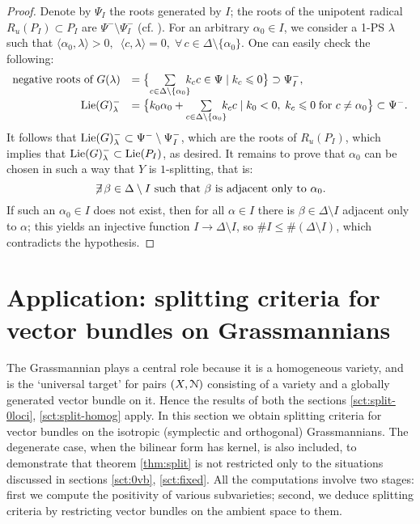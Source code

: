 \documentclass[11pt,reqno]{amsart}
\let\euf\EuScript
\let\lan\langle
\let\ran\rangle
\numberwithin{equation}{section}
\numberwithin{figure}{section}
\let\l\lambda
\let\sm\setminus
\let\les\leqslant
\begin{document}
\begin{proof}
Denote by $\Psi_I$ the roots generated by $I$; the roots of 
the unipotent radical $R_u(P_I)\subset P_I$ are $\Psi^-\sm\Psi^-_I$ 
(cf. \cite[Theorem 8.4.3]{sp}). 
For an arbitrary $\alpha_0\in I$, we consider a 1-PS $\l$ such that 
${{\lan {\alpha_0,\l}\ran}}>0,$ $\,{{\lan {c,\l}\ran}}=0,\;\forall\,c\in\Delta\sm\{\alpha_0\}.$ 
One can easily check the following:
$$
\begin{array}{rl}
\mbox{\rm negative roots of }G(\l)&=\big\{
\underset{c\in\Delta\sm\{\alpha_0\}}{\sum}\kern-1ex
k_cc\in\Psi\mid k_c\les 0\big\} \supset\Psi_I^-, 
\\[2.5ex] 
{\mathop{\rm Lie}\nolimits}(G)_\l^-&=\big\{
k_0\alpha_0+\underset{c\in\Delta\sm\{\alpha_0\}}{\sum}\kern-1exk_cc
\mid k_0<0,\;k_c\les0\;\mbox{\rm for }c\neq\alpha_0
\big\}\subset\Psi^-.
\end{array}
$$
It follows that ${\mathop{\rm Lie}\nolimits}(G)_\l^-\subset\Psi^-\sm\Psi^-_I$, which are the roots of 
$R_u(P_I)$, which implies that ${\mathop{\rm Lie}\nolimits}(G)_\l^-\subset{\mathop{\rm Lie}\nolimits}(P_I)$, as desired. 
It remains to prove that $\alpha_0$ can be chosen in such a way that 
$Y$ is $1$-splitting, that is:
$$
\not\kern-2pt\exists\,\beta\in \Delta\sm I\text{ such that }
\beta\text{ is adjacent only to }\alpha_0.
$$
If such an $\alpha_0\in I$ does not exist, then for all $\alpha\in I$ there is 
$\beta\in\Delta\sm I$ adjacent only to $\alpha$; this yields an injective function 
$I\to\Delta\sm I$, so $\#I\les\#(\Delta\sm I)$, which contradicts the hypothesis.
\end{proof}

\section{Application: splitting criteria for vector bundles on Grassmannians} \label{sct:grass}

The Grassmannian plays a central role because it is a homogeneous variety, and is the 
`universal target' for pairs $(X,{{\euf N}})$ consisting of a variety and a globally generated 
vector bundle on it. 
Hence the results of both the sections \ref{sct:split-0loci}, \ref{sct:split-homog} apply. 
In this section we obtain splitting criteria for vector bundles on the isotropic 
(symplectic and orthogonal) Grassmannians. 
The degenerate case, when the bilinear form has kernel, is also included, to demonstrate 
that theorem \ref{thm:split} is not restricted only to the situations discussed in sections 
\ref{sct:0vb}, \ref{sct:fixed}. All the computations involve two stages: first we compute 
the positivity of various subvarieties; second, we deduce splitting criteria by restricting 
vector bundles on the ambient space to them. 
\end{document}
